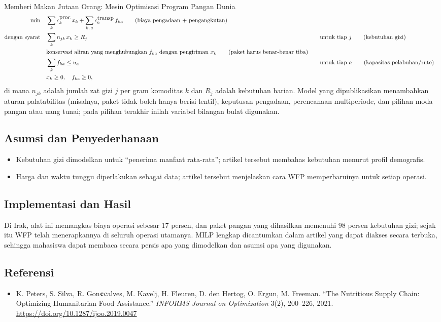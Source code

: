 \begin{casestudybox}{Memberi Makan Jutaan Orang: Mesin Optimisasi Program Pangan Dunia}
\begin{align*}
\min \quad & \sum_{k} c^{\mbox{proc}}_k\, x_k + \sum_{k,\,a} c^{\mbox{transp}}_a\, f_{ka}   \tag{biaya pengadaan + pengangkutan} \\
\mbox{dengan syarat}\quad        & \sum_{k} n_{jk} \, x_k \geq R_j &&\quad \mbox{untuk tiap } j   \tag{kebutuhan gizi} \\
           & \mbox{konservasi aliran yang menghubungkan } f_{ka} \mbox{ dengan pengiriman } x_k   \tag{paket harus benar-benar tiba} \\
           & \sum_{k} f_{ka} \leq u_a &&\quad \mbox{untuk tiap } a   \tag{kapasitas pelabuhan/rute} \\
           & x_k \geq 0, \quad f_{ka} \geq 0,
\end{align*}
di mana $n_{jk}$ adalah jumlah zat gizi $j$ per gram komoditas $k$ dan $R_j$ adalah kebutuhan harian. Model yang dipublikasikan menambahkan aturan palatabilitas (misalnya, paket tidak boleh hanya berisi lentil), keputusan pengadaan, perencanaan multiperiode, dan pilihan moda pangan atau uang tunai; pada pilihan terakhir inilah variabel bilangan bulat digunakan.

\subsection*{Asumsi dan Penyederhanaan}
\begin{itemize}
\item Kebutuhan gizi dimodelkan untuk ``penerima manfaat rata-rata''; artikel tersebut membahas kebutuhan menurut profil demografis.
\item Harga dan waktu tunggu diperlakukan sebagai data; artikel tersebut menjelaskan cara WFP memperbaruinya untuk setiap operasi.
\end{itemize}

\subsection*{Implementasi dan Hasil}
Di Irak, alat ini memangkas biaya operasi sebesar 17 persen, dan paket pangan yang dihasilkan memenuhi 98 persen kebutuhan gizi; sejak itu WFP telah menerapkannya di seluruh operasi utamanya. MILP lengkap dicantumkan dalam artikel yang dapat diakses secara terbuka, sehingga mahasiswa dapat membaca secara persis apa yang dimodelkan dan asumsi apa yang digunakan.

\subsection*{Referensi}
\begin{itemize}
\item K. Peters, S. Silva, R. Gon$\mathbf{c}{c}$alves, M. Kavelj, H. Fleuren, D. den Hertog, O. Ergun, M. Freeman. ``The Nutritious Supply Chain: Optimizing Humanitarian Food Assistance.'' \emph{INFORMS Journal on Optimization} 3(2), 200--226, 2021. \url{https://doi.org/10.1287/ijoo.2019.0047}
\end{itemize}
\end{casestudybox}

